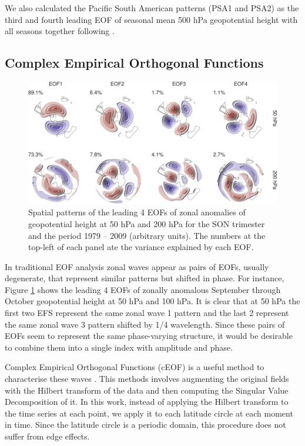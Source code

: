 \documentclass[smallextended]{svjour3}       %
\begin{document}
We also calculated the Pacific South American patterns (PSA1 and PSA2) as the third and fourth leading EOF of seasonal mean 500 hPa geopotential height with all seasons together following \citet{mo2001}.

\hypertarget{complex-empirical-orthogonal-functions}{%
\subsection{Complex Empirical Orthogonal Functions}\label{complex-empirical-orthogonal-functions}}



\begin{figure}
\centering
\includegraphics{../figures/eof-naive-1.pdf}
\caption{\label{fig:eof-naive}Spatial patterns of the leading 4 EOFs of zonal anomalies of geopotential height at 50 hPa and 200 hPa for the SON trimester and the period 1979 -- 2009 (arbitrary units). The numbers at the top-left of each panel ate the variance explained by each EOF.}
\end{figure}

In traditional EOF analysis zonal waves appear as pairs of EOFs, usually degenerate, that represent similar patterns but shifted in phase. For instance, Figure \ref{fig:eof-naive} shows the leading 4 EOFs of zonally anomalous September through October geopotential height at 50 hPa and 100 hPa. It is clear that at 50 hPa the first two EFS represent the same zonal wave 1 pattern and the last 2 represent the same zonal wave 3 pattern shifted by 1/4 wavelength. Since these pairs of EOFs seem to represent the same phase-varying structure, it would be desirable to combine them into a single index with amplitude and phase.

Complex Empirical Orthogonal Functions (cEOF) is a useful method to characterise these waves \citep{horel1984}. This methods involves augmenting the original fields with the Hilbert transform of the data and then computing the Singular Value Decomposition of it. In this work, instead of applying the Hilbert transform to the time series at each point, we apply it to each latitude circle at each moment in time. Since the latitude circle is a periodic domain, this procedure does not suffer from edge effects.
\end{document}
